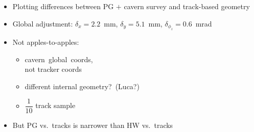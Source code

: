 \documentclass[compress]{beamer}
\begin{document}
\begin{frame}
\begin{columns}
\begin{itemize}
\item Plotting differences between PG $+$ cavern survey and track-based geometry
\item Global adjustment: $\delta_x = 2.2$~mm, $\delta_y = 5.1$~mm, $\delta_{\phi_z} = 0.6$~mrad
\item Not apples-to-apples:
\begin{itemize}
\item \mbox{cavern global coords,\hspace{-1 cm}} \\ not tracker coords
\item different internal \mbox{geometry? (Luca?)\hspace{-2 cm}}
\item $\dfrac{1}{10}$ track sample
\end{itemize}
\item But PG vs.\ tracks is narrower than HW vs.\ tracks
\end{itemize}
\end{columns}
\end{frame}
\end{document}
